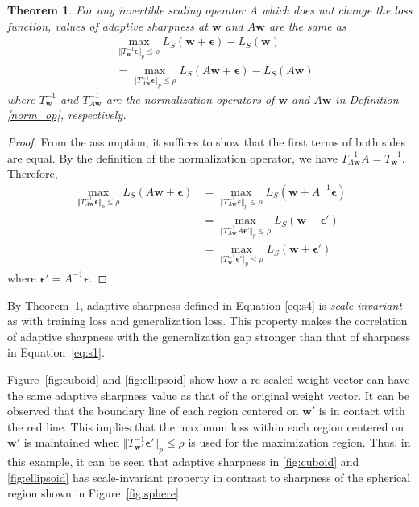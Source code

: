 \documentclass{article}
\newcommand{\mf}[1]{\mathbf{#1}}
\newtheorem{thm}{Theorem}
\begin{document}
\begin{thm} \label{thm1}
	For any invertible scaling operator $A$ which does not change the loss function, values of adaptive sharpness at $\mf{w}$ and $A\mf{w}$ are the same as
	\begin{align*}
	&\max_{\Vert T_\mf{w}^{-1}\bm{\epsilon} \Vert_p \leq \rho} L_S(\mf{w}+\bm{\epsilon}) - L_S(\mf{w})\\
	&= \max_{\Vert T_{A\mf{w}}^{-1}\bm{\epsilon} \Vert_p \leq \rho} L_S(A \mf{w}+\bm{\epsilon}) - L_S(A \mf{w})
	\end{align*}
	where $T_\mf{w}^{-1}$ and $T_{A\mf{w}}^{-1}$ are the normalization operators of $\mf{w}$ and $A\mf{w}$ in Definition \ref{norm_op}, respectively. 
\end{thm}
\begin{proof}
	From the assumption, it suffices to show that the first terms of both sides are equal.
	By the definition of the normalization operator, we have $T_{A\mf{w}}^{-1}A=T_\mf{w}^{-1}$.
	Therefore,
	\begin{align*}
	\max_{\Vert T_{A\mf{w}}^{-1}\bm{\epsilon} \Vert_p \leq \rho} L_S(A \mf{w}+\bm{\epsilon}) &=
	\max_{\Vert T_{A\mf{w}}^{-1}\bm{\epsilon} \Vert_p \leq \rho} L_S(\mf{w}+A^{-1}\bm{\epsilon})\\
	&= \max_{\Vert T_{A\mf{w}}^{-1}A\bm{\epsilon}' \Vert_p \leq \rho} L_S(\mf{w}+\bm{\epsilon}')\\
	&= \max_{\Vert T_\mf{w}^{-1}\bm{\epsilon}' \Vert_p \leq \rho} L_S(\mf{w}+\bm{\epsilon}')
	\end{align*}
	where $\bm{\epsilon}'=A^{-1}\bm\epsilon$.
\end{proof}


By Theorem~\ref{thm1}, adaptive sharpness defined in Equation \ref{eq:s4} is \textit{scale-invariant} as with training loss and generalization loss. 
This property makes the correlation of adaptive sharpness with the generalization gap stronger than that of sharpness in Equation~\ref{eq:s1}.

Figure~\ref{fig:cuboid} and \ref{fig:ellipsoid} show how a re-scaled weight vector can have the same adaptive sharpness value as that of the original weight vector. It can be observed that the boundary line of each region centered on $\mf{w}'$ is in contact with the red line. This implies that the maximum loss within each region centered on $\mf{w}'$ is maintained when $\Vert T^{-1}_{\mf{w}'} \bm{\epsilon}' \Vert_p \leq \rho $ is used for the maximization region. Thus, in this example, it can be seen that adaptive sharpness in \ref{fig:cuboid} and \ref{fig:ellipsoid} has scale-invariant property in contrast to sharpness of the spherical region shown in Figure~\ref{fig:sphere}.
\end{document}

